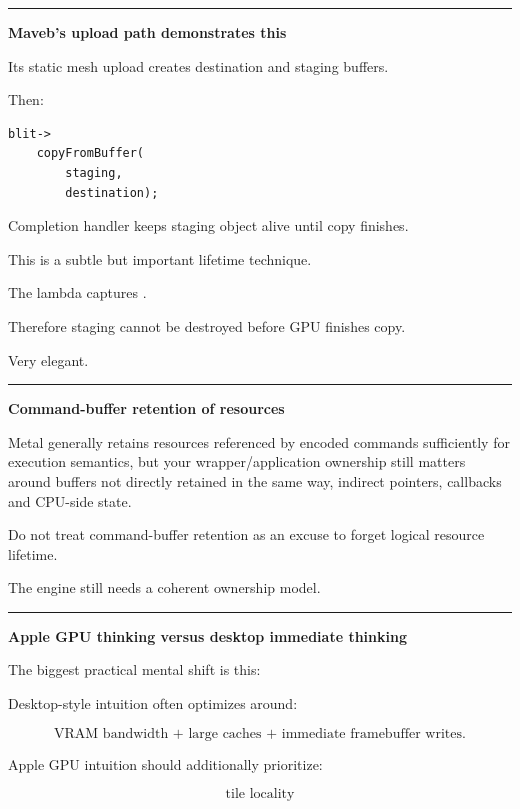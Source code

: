 \begin{center}\rule{0.5\linewidth}{0.5pt}\end{center}

\textbf{Maveb's upload path demonstrates this}

Its static mesh upload creates destination and staging buffers.

Then:

\begin{verbatim}
blit->
    copyFromBuffer(
        staging,
        destination);
\end{verbatim}

Completion handler keeps staging object alive until copy finishes.

This is a subtle but important lifetime technique.

The lambda captures .

Therefore staging cannot be destroyed before GPU finishes copy.

Very elegant.

\begin{center}\rule{0.5\linewidth}{0.5pt}\end{center}

\textbf{Command-buffer retention of resources}

Metal generally retains resources referenced by encoded commands sufficiently for execution semantics, but your wrapper/application ownership still matters around buffers not directly retained in the same way, indirect pointers, callbacks and CPU-side state.

Do not treat command-buffer retention as an excuse to forget logical resource lifetime.

The engine still needs a coherent ownership model.

\begin{center}\rule{0.5\linewidth}{0.5pt}\end{center}

\textbf{Apple GPU thinking versus desktop immediate thinking}

The biggest practical mental shift is this:

Desktop-style intuition often optimizes around:

\[
\boxed{
\text{VRAM bandwidth + large caches + immediate framebuffer writes}.
}
\]

Apple GPU intuition should additionally prioritize:

\[
\boxed{
\text{tile locality}
}
\]

